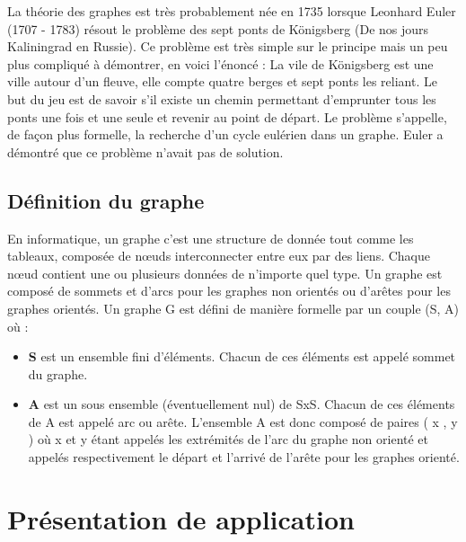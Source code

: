 \documentclass[11pt,twoside,a4paper]{article}
\begin{document}
La théorie des graphes est très probablement née en 1735 lorsque Leonhard Euler (1707 - 1783) résout le problème des sept ponts de Königsberg (De nos jours Kaliningrad en Russie). Ce problème est très simple sur le principe mais un peu plus compliqué à démontrer, en voici l'énoncé : La vile de Königsberg est une ville autour d'un fleuve, elle compte quatre berges et sept ponts les reliant. Le but du jeu est de savoir s'il existe un chemin permettant d'emprunter tous les ponts une fois et une seule et revenir au point de départ. Le problème s'appelle, de façon plus formelle, la recherche d'un cycle eulérien dans un graphe. Euler a démontré que ce problème n'avait pas de solution.


\subsection{Définition du graphe}


En informatique, un graphe c'est une structure de donnée tout comme les tableaux, composée de nœuds interconnecter entre eux par des liens. Chaque nœud contient une ou plusieurs données de n’importe quel type.
Un graphe est composé de sommets et d'arcs  pour les graphes non orientés ou d'arêtes pour les graphes orientés. Un graphe G est défini de manière formelle par un couple (S, A) où :
\begin{itemize}
	\item {\bf S} est un ensemble fini d'éléments. Chacun de ces éléments est appelé sommet du graphe.
	\item {\bf A} est un sous ensemble (éventuellement nul) de SxS. Chacun de ces éléments de A est appelé arc ou arête. L'ensemble A est donc composé de paires ( x , y ) où x et y étant appelés les extrémités de l'arc du graphe non orienté et appelés respectivement le départ et l’arrivé de l'arête pour les graphes orienté.
\end{itemize}


\newpage 
\section{Présentation de application}
\end{document}
